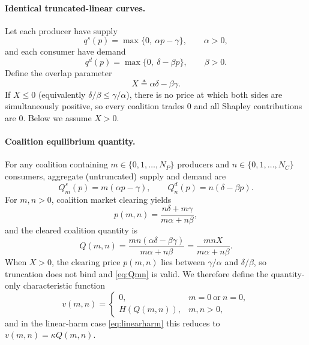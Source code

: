 \documentclass[journal, a4paper]{IEEEtran}
\begin{document}
\paragraph{Identical truncated-linear curves.}
Let each producer have supply
\begin{equation}
q^s(p)=\max\{0,\ \alpha p-\gamma\},\qquad \alpha>0,
\label{eq:lin_supply}
\end{equation}
and each consumer have demand
\begin{equation}
q^d(p)=\max\{0,\ \delta-\beta p\},\qquad \beta>0.
\label{eq:lin_demand}
\end{equation}
Define the overlap parameter
\begin{equation}
X \triangleq \alpha\delta-\beta\gamma.
\label{eq:X_def}
\end{equation}
If $X\le 0$ (equivalently $\delta/\beta\le \gamma/\alpha$), there is no price at which both sides are simultaneously positive, so every coalition trades $0$ and all Shapley contributions are $0$. Below we assume $X>0$.

\paragraph{Coalition equilibrium quantity.}
For any coalition containing $m\in\{0,1,\dots,N_P\}$ producers and $n\in\{0,1,\dots,N_C\}$ consumers, aggregate (untruncated) supply and demand are
\begin{equation}
Q_m^s(p)=m(\alpha p-\gamma),\qquad Q_n^d(p)=n(\delta-\beta p).
\end{equation}
For $m,n>0$, coalition market clearing yields
\begin{equation}
p(m,n)=\frac{n\delta+m\gamma}{m\alpha+n\beta},
\end{equation}
and the cleared coalition quantity is
\begin{equation}
Q(m,n)
=\frac{mn(\alpha\delta-\beta\gamma)}{m\alpha+n\beta}
=\frac{mnX}{m\alpha+n\beta}.
\label{eq:Qmn}
\end{equation}
When $X>0$, the clearing price $p(m,n)$ lies between $\gamma/\alpha$ and $\delta/\beta$, so truncation does not bind and \eqref{eq:Qmn} is valid. We therefore define the quantity-only characteristic function
\begin{equation}
v(m,n)=
\begin{cases}
0, & m=0\ \text{or}\ n=0,\\[4pt]
\displaystyle H(Q(m,n)), & m,n>0,
\end{cases}
\end{equation}
and in the linear-harm case \eqref{eq:linearharm} this reduces to $v(m,n)=\kappa Q(m,n)$.
\end{document}
